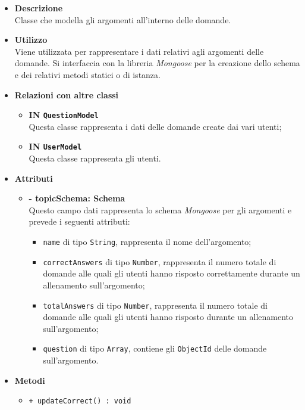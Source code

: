 \begin{itemize}
	\item \textbf{Descrizione} \\
	Classe che modella gli argomenti all'interno delle domande.
	\item \textbf{Utilizzo} \\
	Viene utilizzata per rappresentare i dati relativi agli argomenti delle domande. Si interfaccia con la libreria \textit{Mongoose} per la creazione dello schema e dei relativi metodi statici o di istanza.
	\item \textbf{Relazioni con altre classi}
		\begin{itemize}
			\item \textbf{IN \texttt{QuestionModel}} \\
			Questa classe rappresenta i dati delle domande create dai vari utenti;
			\item \textbf{IN \texttt{UserModel}} \\
			Questa classe rappresenta gli utenti.
		\end{itemize}
	\item \textbf{Attributi}
		\begin{itemize}
			\item \textbf{- topicSchema: Schema} \\
			Questo campo dati rappresenta lo schema \textit{Mongoose} per gli argomenti e prevede i seguenti attributi:
				\begin{itemize}
					\item \texttt{name} di tipo \texttt{String}, rappresenta il nome dell'argomento;
					\item \texttt{correctAnswers} di tipo \texttt{Number}, rappresenta il numero totale di domande alle quali gli utenti hanno risposto correttamente durante un allenamento sull'argomento; 
					\item \texttt{totalAnswers} di tipo \texttt{Number}, rappresenta il numero totale di domande alle quali gli utenti hanno risposto durante un allenamento sull'argomento;
					\item \texttt{question} di tipo \texttt{Array}, contiene gli \texttt{ObjectId} delle domande sull'argomento.
				\end{itemize}
		\end{itemize}
	\item \textbf{Metodi}
		\begin{itemize}
			\item \texttt{+ updateCorrect() : void} \\

\end{itemize}
\end{itemize}

